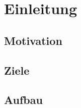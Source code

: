 \newpage
\restoregeometry
\section{Einleitung}
\subsection{Motivation}
\subsection{Ziele}
\subsection{Aufbau}

